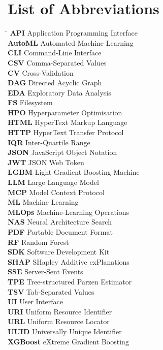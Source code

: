\chapter*{List of Abbreviations}

\begin{tabbing}
\hspace{3.5cm}\= \kill
\textbf{API} \> Application Programming Interface \\
\textbf{AutoML} \> Automated Machine Learning \\
\textbf{CLI} \> Command-Line Interface \\
\textbf{CSV} \> Comma-Separated Values \\
\textbf{CV} \> Cross-Validation \\
\textbf{DAG} \> Directed Acyclic Graph \\
\textbf{EDA} \> Exploratory Data Analysis \\
\textbf{FS} \> Filesystem \\
\textbf{HPO} \> Hyperparameter Optimisation \\
\textbf{HTML} \> HyperText Markup Language \\
\textbf{HTTP} \> HyperText Transfer Protocol \\
\textbf{IQR} \> Inter-Quartile Range \\
\textbf{JSON} \> JavaScript Object Notation \\
\textbf{JWT} \> JSON Web Token \\
\textbf{LGBM} \> Light Gradient Boosting Machine \\
\textbf{LLM} \> Large Language Model \\
\textbf{MCP} \> Model Context Protocol \\
\textbf{ML} \> Machine Learning \\
\textbf{MLOps} \> Machine-Learning Operations \\
\textbf{NAS} \> Neural Architecture Search \\
\textbf{PDF} \> Portable Document Format \\
\textbf{RF} \> Random Forest \\
\textbf{SDK} \> Software Development Kit \\
\textbf{SHAP} \> SHapley Additive exPlanations \\
\textbf{SSE} \> Server-Sent Events \\
\textbf{TPE} \> Tree-structured Parzen Estimator \\
\textbf{TSV} \> Tab-Separated Values \\
\textbf{UI} \> User Interface \\
\textbf{URI} \> Uniform Resource Identifier \\
\textbf{URL} \> Uniform Resource Locator \\
\textbf{UUID} \> Universally Unique Identifier \\
\textbf{XGBoost} \> eXtreme Gradient Boosting \\
\end{tabbing}
\clearpage
